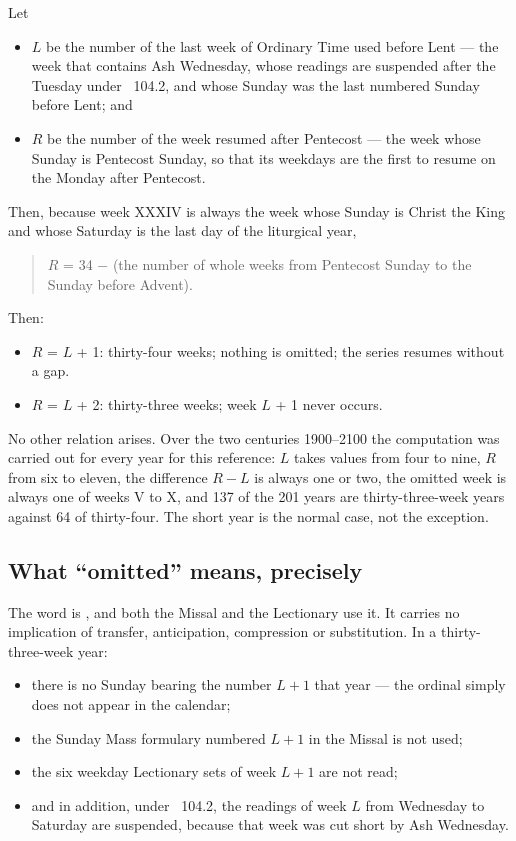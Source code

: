 Let

\begin{itemize}
\item $L$ be the number of the last week of Ordinary Time used before Lent --- the week that contains
Ash Wednesday, whose readings are suspended after the Tuesday under ~104.2, and whose Sunday
was the last numbered Sunday before Lent; and
\item $R$ be the number of the week resumed after Pentecost --- the week whose Sunday is Pentecost
Sunday, so that its weekdays are the first to resume on the Monday after Pentecost.
\end{itemize}

Then, because week XXXIV is always the week whose Sunday is Christ the King and whose Saturday is
the last day of the liturgical year,

\begin{quote}
$R$ = 34 $-$ (the number of whole weeks from Pentecost Sunday to the Sunday before Advent).
\end{quote}

Then:

\begin{itemize}
\item $R$ = $L$ + 1: thirty-four weeks; nothing is omitted; the series resumes without a gap.
\item $R$ = $L$ + 2: thirty-three weeks; week $L$ + 1 never occurs.
\end{itemize}

No other relation arises. Over the two centuries 1900--2100 the computation was carried out for
every year for this reference: $L$ takes values from four to nine, $R$ from six to eleven, the
difference $R-L$ is always one or two, the omitted week is always one of weeks V to X, and 137 of
the 201 years are thirty-three-week years against 64 of thirty-four. The short year is the normal
case, not the exception.

\subsection{What ``omitted'' means, precisely}

The word is , and both the Missal and the Lectionary use it. It carries no
implication of transfer, anticipation, compression or substitution. In a thirty-three-week year:

\begin{itemize}
\item there is no Sunday bearing the number $L+1$ that year --- the ordinal simply does not appear in
the calendar;
\item the Sunday Mass formulary numbered $L+1$ in the Missal is not used;
\item the six weekday Lectionary sets of week $L+1$ are not read;
\item and in addition, under ~104.2, the readings of week $L$ from Wednesday to Saturday are
suspended, because that week was cut short by Ash Wednesday.
\end{itemize}

